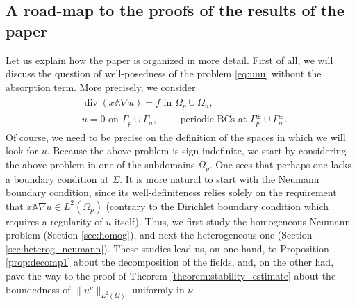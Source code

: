 \documentclass[report]{elsarticle}
\numberwithin{theorem}{section}
\begin{document}
\subsection{A road-map to the proofs of the results of the paper}
Let us explain how the paper is organized in more detail. First of all, we will discuss the question of well-posedness of the problem \eqref{eq:unu} without the  absorption term. More precisely, we consider 
\begin{align}
	\label{eq:pb_two_domains}
	\begin{split}
		&\operatorname{div}(x\mathbb{A}\nabla u)=f\text{ in }\Omega_p\cup\Omega_n,\\
		&u=0 \text{ on }\Gamma_p\cup\Gamma_n,\qquad \text{ periodic BCs at }\Gamma^{\pm}_p\cup\Gamma^{\pm}_n. 
	\end{split}
\end{align}
Of course, we need to be precise on the definition of the spaces in which we will look for $u$. Because the above problem is sign-indefinite, we start by considering the above problem in one of the subdomains $\Omega_p$. 
One sees that perhaps one lacks a boundary condition at $\Sigma$. It is more natural to start with the Neumann boundary condition, since its well-definiteness relies solely on the requirement that  $x\mathbb{A}\nabla u\in L^2(\Omega_p)$ (contrary to the Dirichlet boundary condition which requires a regularity of $u$ itself). Thus, we first study the homogeneous Neumann problem (Section \ref{sec:homog}), and next the heterogeneous one (Section \ref{sec:heterog_neumann}). These studies lead us, on one hand, to Proposition \ref{prop:decomp1} about the decomposition of the fields, and, on the other had, pave the way to the proof of Theorem \ref{theorem:stability_estimate} about the boundedness of $\|u^{\nu}\|_{L^2(\Omega)}$ uniformly in $\nu$. 
\end{document}
